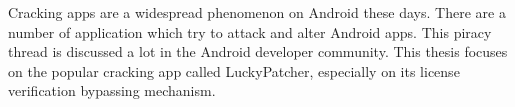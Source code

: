 Cracking apps are a widespread phenomenon on Android these days.
There are a number of application which try to attack and alter Android apps.
This piracy thread is discussed a lot in the Android developer community.
This thesis focuses on the popular cracking app called LuckyPatcher, especially on its license verification bypassing mechanism.

